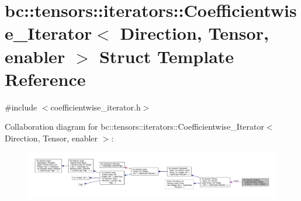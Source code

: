 \hypertarget{structbc_1_1tensors_1_1iterators_1_1Coefficientwise__Iterator}{}\section{bc\+:\+:tensors\+:\+:iterators\+:\+:Coefficientwise\+\_\+\+Iterator$<$ Direction, Tensor, enabler $>$ Struct Template Reference}
\label{structbc_1_1tensors_1_1iterators_1_1Coefficientwise__Iterator}


{\ttfamily \#include $<$coefficientwise\+\_\+iterator.\+h$>$}



Collaboration diagram for bc\+:\+:tensors\+:\+:iterators\+:\+:Coefficientwise\+\_\+\+Iterator$<$ Direction, Tensor, enabler $>$\+:\nopagebreak
\begin{figure}[H]
\begin{center}
\leavevmode
\includegraphics[width=350pt]{structbc_1_1tensors_1_1iterators_1_1Coefficientwise__Iterator__coll__graph}
\end{center}
\end{figure}
